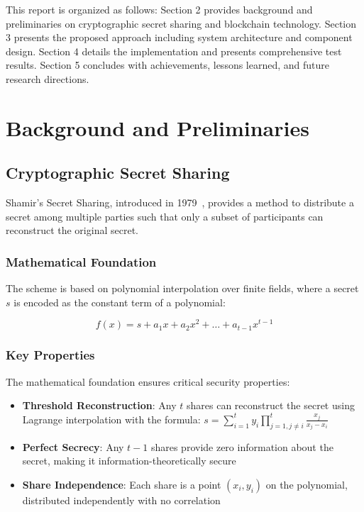 \documentclass[12pt,a4paper]{article}
\begin{document}
This report is organized as follows: Section 2 provides background and preliminaries on cryptographic secret sharing and blockchain technology. Section 3 presents the proposed approach including system architecture and component design. Section 4 details the implementation and presents comprehensive test results. Section 5 concludes with achievements, lessons learned, and future research directions.
\clearpage
\section{Background and Preliminaries}
\subsection{Cryptographic Secret Sharing}

Shamir's Secret Sharing, introduced in 1979~\cite{shamir1979share}, provides a method to distribute a secret among multiple parties such that only a subset of participants can reconstruct the original secret.

\subsubsection{Mathematical Foundation}

The scheme is based on polynomial interpolation over finite fields, where a secret $s$ is encoded as the constant term of a polynomial:

\begin{equation}
f(x) = s + a_1x + a_2x^2 + \ldots + a_{t-1}x^{t-1}
\end{equation}

\subsubsection{Key Properties}

The mathematical foundation ensures critical security properties:

\begin{itemize}[leftmargin=15pt]
    \item \textbf{Threshold Reconstruction}: Any $t$ shares can reconstruct the secret using Lagrange interpolation with the formula: $s = \sum_{i=1}^{t} y_i \prod_{j=1,j \neq i}^{t} \frac{x_j}{x_j - x_i}$
    \item \textbf{Perfect Secrecy}: Any $t-1$ shares provide zero information about the secret, making it information-theoretically secure
    \item \textbf{Share Independence}: Each share is a point $(x_i, y_i)$ on the polynomial, distributed independently with no correlation
\end{itemize}
\end{document}
